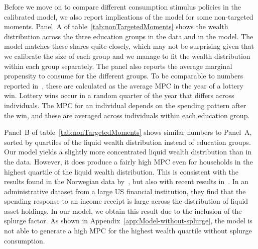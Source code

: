 \documentclass[qe]{econsocart}
\begin{document}
Before we move on to compare different consumption stimulus policies in the calibrated model, we also report implications of the model for some non-targeted moments.
Panel~A of table~\ref{tab:nonTargetedMoments} shows the wealth distribution across the three education groups in the data and in the model.
The model matches these shares quite closely, which may not be surprising given that we calibrate the size of each group and we manage to fit the wealth distribution within each group separately.
The panel also reports the average marginal propensity to consume for the different groups.
To be comparable to numbers reported in~\cite{fagereng-mpc-2021}, these are calculated as the average MPC in the year of a lottery win.
Lottery wins occur in a random quarter of the year that differs across individuals.
The MPC for an individual depends on the spending pattern after the win, and these are averaged across individuals within each education group.

Panel~B of table~\ref{tab:nonTargetedMoments} shows similar numbers to Panel~A, sorted by quartiles of the liquid wealth distribution instead of education groups.
Our model yields a slightly more concentrated liquid wealth distribution than in the data.
However, it does produce a fairly high MPC even for households in the highest quartile of the liquid wealth distribution.
This is consistent with the results found in the Norwegian data by~\cite{fagereng-mpc-2021}, but also with recent results in~\cite{graham2024mental}.
In an administrative dataset from a large US financial institution, they find that the spending response to an income receipt is large across the distribution of liquid asset holdings.
In our model, we obtain this result due to the inclusion of the splurge factor.
As shown in Appendix~\ref{app:Model-without-splurge}, the model is not able to generate a high MPC for the highest wealth quartile without splurge consumption.
\end{document}
